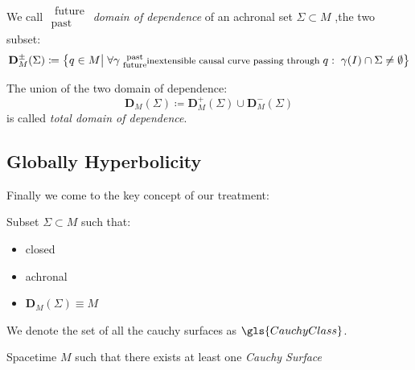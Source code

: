 \documentclass[Main]{subfiles}
\begin{document}
			\begin{definition}
				We call \emph{$\substack{\textrm{ future}\\ \textrm{past } } $ domain of dependence} of an achronal set  $\Sigma \subset M$ ,the two subset:
				\begin{displaymath}		
					\mathbf{D}_M^\pm(\Sigma) \coloneqq \big\{ q \in M \big\vert \; \forall \gamma \substack{\textrm{ past}\\ \textrm{ future} }\textrm{\footnotesize inextensible causal curve passing through }q : \; \gamma(I) \cap \Sigma \neq \emptyset  \big\}
				\end{displaymath}		
			\end{definition}
			The union of the two domain of dependence:
			$$\mathbf{D}_M(\Sigma)  \coloneqq \mathbf{D}_M^+(\Sigma) \cup \mathbf{D}_M^-(\Sigma)$$ 
			is called \emph{total domain of dependence}.
		
		\subsection{Globally Hyperbolicity}
			Finally we come to the key concept of our treatment:
			
			\begin{definition}
				Subset $\Sigma \subset M$ such that:
				\begin{itemize}
					\item closed
					\item achronal
					\item $\mathbf{D}_M(\Sigma) \equiv M$
				\end{itemize}
			\end{definition}
			\begin{notationfix}
				We denote the set of all the cauchy surfaces as $\gls{CauchyClass}$.
			\end{notationfix}
		\begin{definition}\label{Def:GHSP}
			 Spacetime $M$ such that there exists at least one \emph{Cauchy Surface}
		\end{definition}
\end{document}

